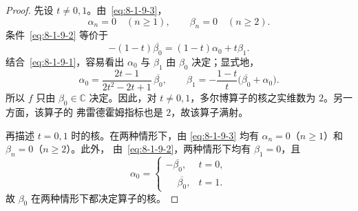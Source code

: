 \begin{proof}
先设 $t\neq0,1$。由~\eqref{eq:8-1-9-3}，
\[
 \alpha_n=0\quad(n\geq1),
 \qquad
 \beta_n=0\quad(n\geq2).
\]
条件~\eqref{eq:8-1-9-2} 等价于
\[
 -(1-t)\overline{\beta_0}=(1-t)\alpha_0+t\beta_1.
\]
结合~\eqref{eq:8-1-9-1}，容易看出 $\alpha_0$ 与 $\beta_1$
由 $\beta_0$ 决定；显式地，
\[
 \alpha_0=\frac{2t-1}{2t^2-2t+1}\,\overline{\beta_0},
 \qquad
 \beta_1=-\frac{1-t}{t}
 \bigl(\overline{\beta_0}+\alpha_0\bigr).
\]
所以 $f$ 只由 $\beta_0\in\mathbb C$ 决定。因此，对
$t\neq0,1$，多尔博算子的核之实维数为 $2$。另一方面，该算子的
弗雷德霍姆指标也是 $2$，故该算子满射。

再描述 $t=0,1$ 时的核。在两种情形下，由
\eqref{eq:8-1-9-3} 均有
$\alpha_n=0$（$n\geq1$）和 $\beta_n=0$（$n\geq2$）。此外，
由~\eqref{eq:8-1-9-2}，两种情形下均有 $\beta_1=0$，且
\[
 \alpha_0=
 \begin{cases}
  -\overline{\beta_0},&t=0,\\
  \phantom{-}\overline{\beta_0},&t=1.
 \end{cases}
\]
故 $\beta_0$ 在两种情形下都决定算子的核。


\end{proof}
